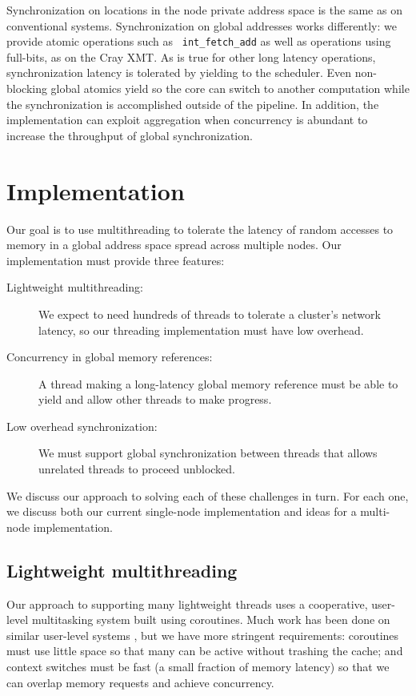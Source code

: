 \documentclass[10pt,nocopyrightspace,preprint]{sigplanconf}
\begin{document}
Synchronization on locations in the node private address space is the
same as on conventional systems.  Synchronization on global addresses
works differently: we provide atomic operations such as {\tt
  int\_fetch\_add} as well as operations using full-bits, as on
the Cray XMT.  As is true for other long latency operations,
synchronization latency is tolerated by yielding to the scheduler.
Even non-blocking global atomics yield so the core can switch to
another computation while the synchronization is accomplished outside
of the pipeline.  In addition, the implementation can exploit
aggregation when concurrency is abundant to increase the throughput of
global synchronization.

\section{Implementation}
\label{sec:approach}
Our goal is to use multithreading to tolerate
the latency of random accesses to memory in a global address space
spread across multiple nodes.  Our implementation must provide three features:
\begin{description}
\item[Lightweight multithreading:] We expect to need hundreds of
  threads to tolerate a cluster's network latency, so our threading
  implementation must have low overhead.

\item[Concurrency in global memory references:] A thread making a
  long-latency global memory reference must be able to yield and allow
  other threads to make progress.

\item[Low overhead synchronization:] 
  We must support global synchronization between threads that allows unrelated threads to proceed unblocked.
\end{description}
We discuss our approach to solving each of these challenges in
turn. For each one, we discuss both our current single-node
implementation and ideas for a multi-node implementation.

\subsection{Lightweight multithreading}

Our approach to supporting many lightweight threads uses a
cooperative, user-level multitasking system built using
coroutines. Much work has been done on similar user-level systems
\cite{ult,capriccio}, but we have more stringent requirements:
coroutines must use little space so that many can be active without
trashing the cache; and context switches must be fast (a small
fraction of memory latency) so that we can overlap memory requests and
achieve concurrency.
\end{document}
